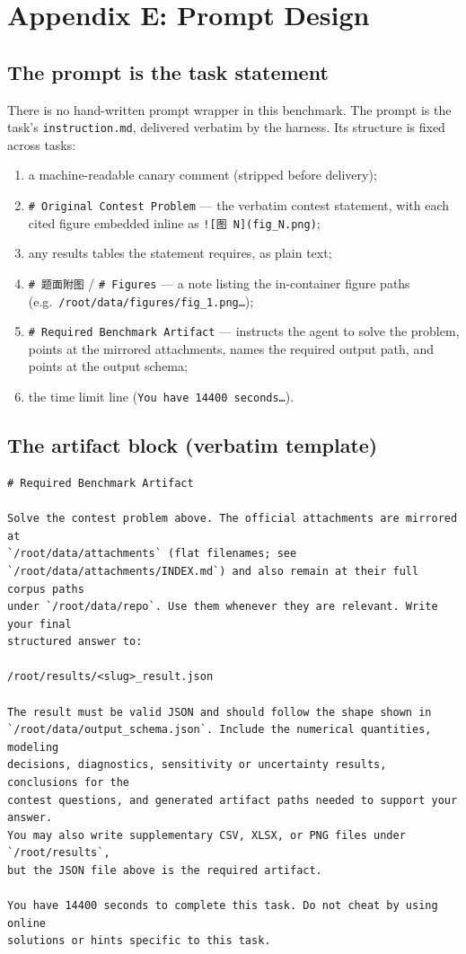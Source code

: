 \section{Appendix E: Prompt Design}
\label{app:prompts}

\subsection{The prompt is the task statement}
There is no hand-written prompt wrapper in this benchmark. The prompt is the
task's \texttt{instruction.md}, delivered verbatim by the harness. Its structure
is fixed across tasks:

\begin{enumerate}[leftmargin=1.4em,itemsep=1pt]
\item a machine-readable canary comment (stripped before delivery);
\item \texttt{\# Original Contest Problem} --- the verbatim contest statement,
with each cited figure embedded inline as \texttt{![图 N](fig\_N.png)};
\item any results tables the statement requires, as plain text;
\item \texttt{\# 题面附图} / \texttt{\# Figures} --- a note listing the
in-container figure paths (e.g.\ \texttt{/root/data/figures/fig\_1.png\ldots});
\item \texttt{\# Required Benchmark Artifact} --- instructs the agent to solve
the problem, points at the mirrored attachments, names the required output path,
and points at the output schema;
\item the time limit line (\texttt{You have 14400 seconds\ldots}).
\end{enumerate}

\subsection{The artifact block (verbatim template)}
\begin{verbatim}
# Required Benchmark Artifact

Solve the contest problem above. The official attachments are mirrored at
`/root/data/attachments` (flat filenames; see
`/root/data/attachments/INDEX.md`) and also remain at their full corpus paths
under `/root/data/repo`. Use them whenever they are relevant. Write your final
structured answer to:

/root/results/<slug>_result.json

The result must be valid JSON and should follow the shape shown in
`/root/data/output_schema.json`. Include the numerical quantities, modeling
decisions, diagnostics, sensitivity or uncertainty results, conclusions for the
contest questions, and generated artifact paths needed to support your answer.
You may also write supplementary CSV, XLSX, or PNG files under `/root/results`,
but the JSON file above is the required artifact.

You have 14400 seconds to complete this task. Do not cheat by using online
solutions or hints specific to this task.
\end{verbatim}

